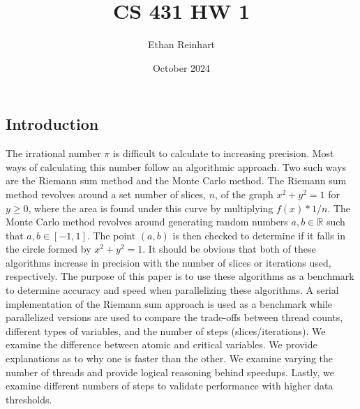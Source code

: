 \documentclass{article}
\title{CS 431 HW 1}
\author{Ethan Reinhart }
\date{October 2024}
\begin{document}
\maketitle

\begin{multicols}{2}
\section{Introduction}
The irrational number $\pi$ is difficult to calculate to increasing precision. Most ways of calculating this number follow an algorithmic approach. Two such ways are the Riemann sum method and the Monte Carlo method.
The Riemann sum method revolves around a set number of slices, $n$, of the graph $x^2 + y^2 = 1$ for $y \geq 0$, where the area is found under this curve by multiplying $f(x) * 1/n$. The Monte Carlo method revolves around generating random numbers $a, b \in \mathbb{R}$ such that $a, b \in [-1, 1]$. The point $(a, b)$ is then checked to determine if it falls in the circle formed by $x^2 + y^2 = 1$. It should be obvious that both of these algorithms increase in precision with the number of slices or iterations used, respectively. The purpose of this paper is to use these algorithms as a benchmark to determine accuracy and speed when parallelizing these algorithms. A serial implementation of the Riemann sum approach is used as a benchmark while parallelized versions are used to compare the trade-offs between thread counts, different types of variables, and the number of steps (slices/iterations). We examine the difference between atomic and critical variables. We provide explanations as to why one is faster than the other. We examine varying the number of threads and provide logical reasoning behind speedups. Lastly, we examine different numbers of steps to validate performance with higher data thresholds.





\end{multicols}
\end{document}
